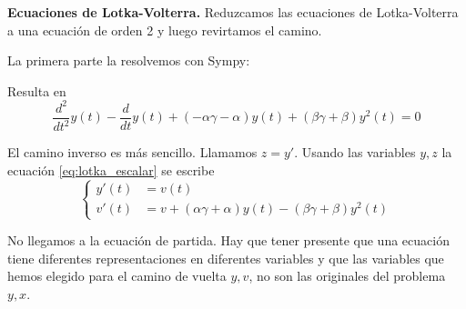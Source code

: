 \begin{ejemplo} \textbf{Ecuaciones de Lotka-Volterra.} Reduzcamos las ecuaciones de Lotka-Volterra a una ecuación de orden 2 y luego revirtamos el camino.

La primera parte la resolvemos con Sympy:

Resulta en
\begin{equation}\label{eq:lotka_escalar}\frac{d^{2}}{d t^{2}}  y{\left (t \right )- \frac{d}{d t} y{\left (t \right )} +
\left(- \alpha \gamma - \alpha\right) y{\left (t \right )} + \left(\beta \gamma + \beta\right) y^{2}{\left (t \right )} }=0
\end{equation}

El camino inverso es más sencillo. Llamamos $z=y'$. Usando las variables $y,z$ la ecuación \eqref{eq:lotka_escalar} se escribe
\[
 \left\{
 \begin{array}{ll}
    y'(t)&=v(t)\\
    v'(t)&=v+\left( \alpha \gamma + \alpha\right) y{\left (t \right )} - \left(\beta \gamma + \beta\right) y^{2}{\left (t \right )}
 \end{array}
 \right.
 \]

 No llegamos a la ecuación de partida. Hay que tener presente que una ecuación tiene diferentes representaciones en diferentes variables y que las variables que hemos elegido para el camino de vuelta $y,v$, no son las originales del problema $y,x$.


\end{ejemplo}


  
  